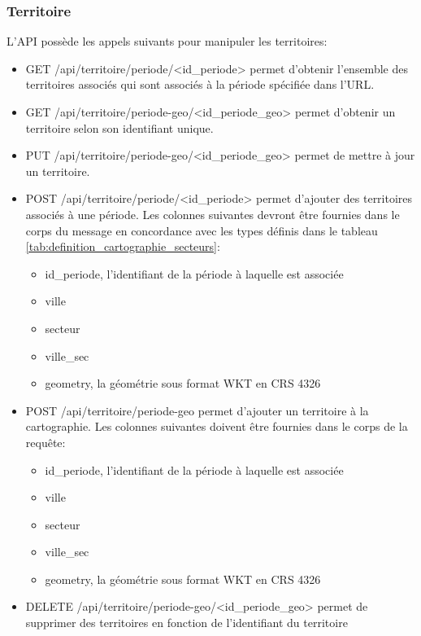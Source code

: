 \subsubsection{Territoire}
L'\ac{API} possède les appels suivants pour manipuler les territoires:
\begin{itemize}
    \item GET /api/territoire/periode/<id\_periode> permet d'obtenir l'ensemble des territoires associés qui sont associés à la période spécifiée dans l'\ac{URL}.
    \item GET /api/territoire/periode-geo/<id\_periode\_geo> permet d'obtenir un territoire selon son identifiant unique.
    \item PUT /api/territoire/periode-geo/<id\_periode\_geo> permet de mettre à jour un territoire.
    \item POST /api/territoire/periode/<id\_periode> permet d'ajouter des territoires associés à une période. Les colonnes suivantes devront être fournies dans le corps du message en concordance avec les types définis dans le tableau \ref{tab:definition_cartographie_secteurs}:
    \begin{itemize}
        \item id\_periode, l'identifiant de la période à laquelle est associée 
        \item ville
        \item secteur
        \item ville\_sec
        \item geometry, la géométrie sous format WKT en CRS 4326
    \end{itemize}
    \item POST /api/territoire/periode-geo permet d'ajouter un territoire à la cartographie. Les colonnes suivantes doivent être fournies dans le corps de la requête:
    \begin{itemize}
        \item id\_periode, l'identifiant de la période à laquelle est associée 
        \item ville
        \item secteur
        \item ville\_sec
        \item geometry, la géométrie sous format WKT en CRS 4326
    \end{itemize}
    \item DELETE /api/territoire/periode-geo/<id\_periode\_geo> permet de supprimer des territoires en fonction de l'identifiant du territoire
\end{itemize}
\clearpage
